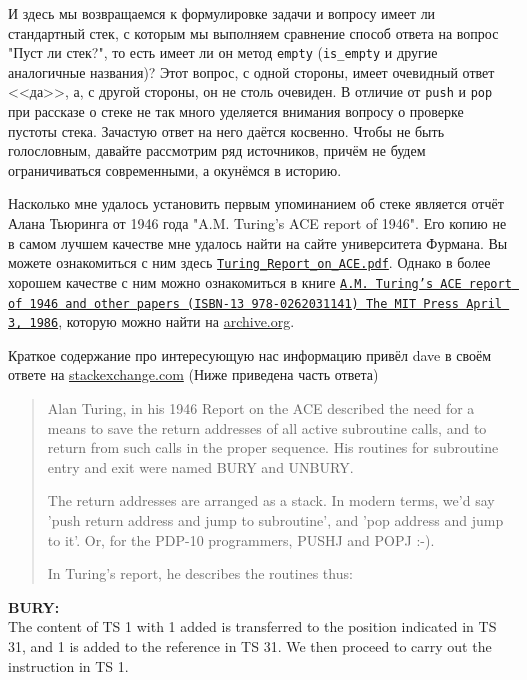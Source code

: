 И здесь мы возвращаемся к формулировке задачи и вопросу имеет ли стандартный стек, с которым мы выполняем сравнение способ ответа на вопрос "Пуст ли стек?", то есть имеет ли он метод \texttt{empty} (\texttt{is_empty} и другие аналогичные названия)? 
Этот вопрос, с одной стороны, имеет очевидный ответ <<да>>, а, с другой стороны, он не столь очевиден. В отличие от \texttt{push} и \texttt{pop} при рассказе о стеке не так много уделяется внимания вопросу о проверке пустоты стека. Зачастую ответ на него даётся косвенно. Чтобы не быть голословным, давайте рассмотрим ряд источников, причём не будем ограничиваться современными, а окунёмся в историю. 

Насколько мне удалось установить первым упоминанием об стеке является отчёт Алана Тьюринга от 1946 года "A.M. Turing's ACE report of 1946". Его копию не в самом лучшем качестве мне удалось найти на сайте университета Фурмана. Вы можете ознакомиться с ним здесь \href{https://cs.furman.edu/~tallen/csc475/materials/Turing_Report_on_ACE.pdf}{\textcolor{UrlColorText}{\texttt{Turing_Report_on_ACE.pdf}}}. Однако в более хорошем качестве с ним можно ознакомиться в книге \href{https://archive.org/details/amturingsacerepo00turi/page/n3/mode/2up}{\textcolor{UrlColorText}{\texttt{A.M. Turing's ACE report of 1946 and other papers (ISBN-13 978-0262031141) The MIT Press April 3, 1986}}}, которую можно найти на \href{https://archive.org/details/amturingsacerepo00turi/page/n3/mode/2up}{\textcolor{UrlColorText}{archive.org}}. 

Краткое содержание про интересующую нас информацию привёл dave в своём ответе на \href{https://retrocomputing.stackexchange.com/questions/25850/what-motivated-stack-being-invented-originally}{\textcolor{UrlColorText}{stackexchange.com}} (Ниже приведена часть ответа)
\begin{quotation}
  Alan Turing, in his 1946 Report on the ACE described the need for a means to save the return addresses of all active subroutine calls, and to return from such calls in the proper sequence. His routines for subroutine entry and exit were named BURY and UNBURY.

  The return addresses are arranged as a stack. In modern terms, we'd say 'push return address and jump to subroutine', and 'pop address and jump to it'. Or, for the PDP-10 programmers, PUSHJ and POPJ :-).

In Turing's report, he describes the routines thus:
\end{quotation}

\textbf{BURY:}\\
The content of TS 1 with 1 added is transferred to the position indicated in TS 31, and 1 is added to the reference in TS 31. We then proceed to carry out the instruction in TS 1.


